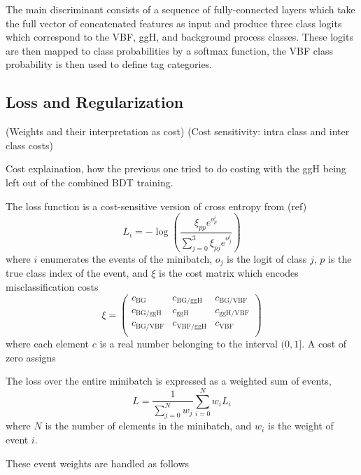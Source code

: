 The main discriminant consists of a sequence of fully-connected layers which take the full vector of concatenated features as input and produce three class logits which correspond to the VBF, ggH, and background process classes. 
These logits are then mapped to class probabilities by a softmax function, the VBF class probability is then used to define tag categories. 

\subsection{Loss and Regularization}
(Weights and their interpretation as cost)
(Cost sensitivity: intra class and inter class costs)

Cost explaination, how the previous one tried to do costing with the ggH being left out of the combined BDT training. 

The loss function is a cost-sensitive version of cross entropy from (ref)
\begin{equation}
    L_i = -\log\left(\frac{\xi_{pp}e^{o^{i}_{p}}}{\sum_{j=0}^{3}\xi_{pj}e^{o^{i}_{j}}}\right)
\end{equation} 
where $i$ enumerates the events of the minibatch, $o_j$ is the logit of class $j$, $p$ is the true class index of the event, and $\xi$ is the cost matrix which encodes misclassification costs
\begin{equation}
    \xi = \begin{pmatrix}
        c_{\mathrm{BG}} & c_{\mathrm{BG}/\mathrm{ggH}} & c_{\mathrm{BG}/\mathrm{VBF}} \\
        c_{\mathrm{BG}/\mathrm{ggH}} & c_{\mathrm{ggH}} & c_{\mathrm{ggH}/\mathrm{VBF}} \\
        c_{\mathrm{BG}/\mathrm{VBF}} & c_{\mathrm{VBF}/\mathrm{ggH}} & c_{\mathrm{VBF}} \\
    \end{pmatrix}
\end{equation}
where each element $c$ is a real number belonging to the interval $(0,1]$. A cost of zero assigns

The loss over the entire minibatch is expressed as a weighted sum of events,
\begin{equation}
    L = \frac{1}{\sum_{j=0}^{N}w_{j}}\sum_{i=0}^{N}w_{i}L_{i}
\end{equation} 
where $N$ is the number of elements in the minibatch, and $w_i$ is the weight of event $i$.

These event weights are handled as follows


